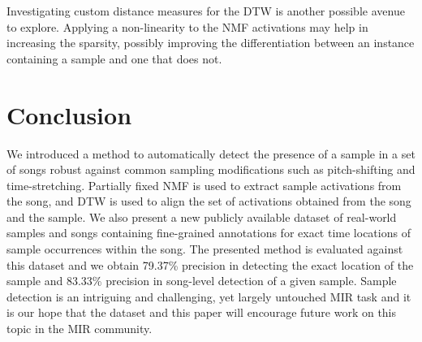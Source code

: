 \documentclass{article}
\begin{document}
Investigating custom distance measures for the DTW is another possible avenue to explore. Applying a non-linearity to the NMF activations may help in increasing the sparsity, possibly improving the differentiation between an instance containing a sample and one that does not.

\section{Conclusion}


We introduced a method to automatically detect the presence of a sample in a set of songs robust against common sampling modifications such as pitch-shifting and time-stretching. Partially fixed NMF is used to extract sample activations from the song, and DTW is used to align the set of activations obtained from the song and the sample. 
We also present a new publicly available dataset of real-world samples and songs containing fine-grained annotations for exact time locations of sample occurrences within the song. The presented method is evaluated against this dataset and we obtain 79.37\% precision in detecting the exact location of the sample and 83.33\% precision in song-level detection of a given sample. %
Sample detection is an intriguing and challenging, yet largely untouched MIR task and it is our hope that the dataset and this paper will encourage future work on this topic in the MIR community.
\newpage


%
%
%
%
\end{document}

